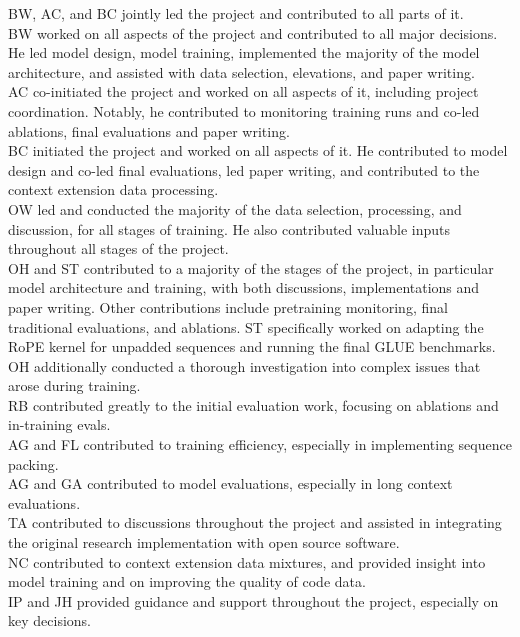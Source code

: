 BW, AC, and BC jointly led the project and contributed to all parts of it. \\
BW worked on all aspects of the project and contributed to all major decisions. He led model design, model training, implemented the majority of the model architecture, and assisted with data selection, elevations, and paper writing.\\
AC co-initiated the project and worked on all aspects of it, including project coordination. Notably, he contributed to monitoring training runs and co-led ablations, final evaluations and paper writing.\\
BC initiated the project and worked on all aspects of it. He contributed to model design and co-led final evaluations, led paper writing, and contributed to the context extension data processing.\\
OW led and conducted the majority of the data selection, processing, and discussion, for all stages of training. He also contributed valuable inputs throughout all stages of the project.\\
OH and ST contributed to a majority of the stages of the project, in particular model architecture and training, with both discussions, implementations and paper writing. Other contributions include pretraining monitoring, final traditional evaluations, and ablations. ST specifically worked on adapting the RoPE kernel for unpadded sequences and running the final GLUE benchmarks. OH additionally conducted a thorough investigation into complex issues that arose during training.\\
RB contributed greatly to the initial evaluation work, focusing on ablations and in-training evals.\\
AG and FL contributed to training efficiency, especially in implementing sequence packing.\\
AG and GA contributed to model evaluations, especially in long context evaluations.\\
TA contributed to discussions throughout the project and assisted in integrating the original research implementation with open source software.\\
NC contributed to context extension data mixtures, and provided insight into model training and on improving the quality of code data.\\
IP and JH provided guidance and support throughout the project, especially on key decisions.